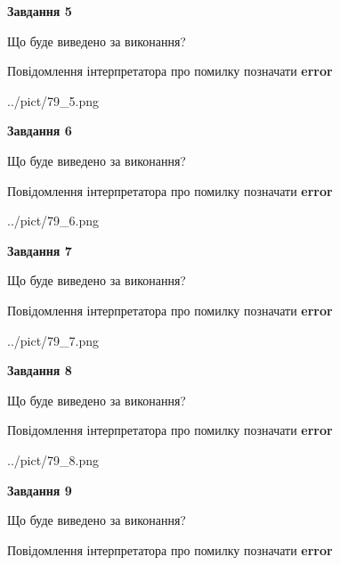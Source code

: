 \documentclass[11pt, ukrainian]{article}
\begin{document}
{\begin {large}
{\begin {center}\textbf{Завдання 5}\end {center}}\par
Що буде виведено за виконання? \par
Повідомлення інтерпретатора про помилку позначати \textbf{error}

\begin{center}
	{../pict/79_5.png}
\end{center}
\newpage

{\begin {center}\textbf{Завдання 6}\end {center}}\par
Що буде виведено за виконання? \par
Повідомлення інтерпретатора про помилку позначати \textbf{error}

\begin{center}
	{../pict/79_6.png}
\end{center}
\newpage

{\begin {center}\textbf{Завдання 7}\end {center}}\par
Що буде виведено за виконання? \par
Повідомлення інтерпретатора про помилку позначати \textbf{error}

\begin{center}
	{../pict/79_7.png}
\end{center}
\newpage

{\begin {center}\textbf{Завдання 8}\end {center}}\par
Що буде виведено за виконання? \par
Повідомлення інтерпретатора про помилку позначати \textbf{error}

\begin{center}
	{../pict/79_8.png}
\end{center}
\newpage

{\begin {center}\textbf{Завдання 9}\end {center}}\par
Що буде виведено за виконання? \par
Повідомлення інтерпретатора про помилку позначати \textbf{error}


\end{large}}
\end{document}
